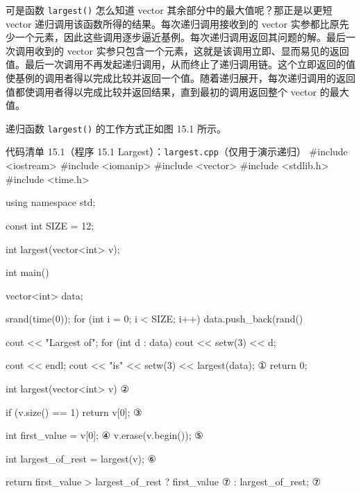 可是函数 \texttt{largest()} 怎么知道 vector 其余部分中的最大值呢？那正是以更短 vector 递归调用该函数所得的结果。每次递归调用接收到的 vector 实参都比原先少一个元素，因此这些调用逐步逼近基例。每次递归调用返回其问题的解。最后一次调用收到的 vector 实参只包含一个元素，这就是该调用立即、显而易见的返回值。最后一次调用不再发起递归调用，从而终止了递归调用链。这个立即返回的值使基例的调用者得以完成比较并返回一个值。随着递归展开，每次递归调用的返回值都使调用者得以完成比较并返回结果，直到最初的调用返回整个 vector 的最大值。


递归函数 \texttt{largest()} 的工作方式正如图 15.1 所示。

\begin{codeboxt}{代码清单 15.1（程序 15.1 Largest）：\texttt{largest.\allowbreak{}cpp}（仅用于演示递归）}
#include <iostream>
#include <iomanip>
#include <vector>
#include <stdlib.h>
#include <time.h>

using namespace std;

const int SIZE = 12;

int largest(vector<int> v);

int main()
{
    vector<int> data;

    srand(time(0));
    for (int i = 0; i < SIZE; i++) data.push_back(rand()%

    cout << "Largest of";
    for (int d : data) cout << setw(3) << d;

    cout << endl;
    cout << "is" << setw(3) << largest(data);               ①
    return 0;
}

int largest(vector<int> v)                                  ②
{
    if (v.size() == 1) return v[0];                         ③

    int first_value = v[0];                                 ④
    v.erase(v.begin());                                     ⑤

    int largest_of_rest = largest(v);                       ⑥

    return first_value > largest_of_rest ? first_value      ⑦
                                         : largest_of_rest; ⑦

}
\end{codeboxt}
\par
{}\par
{}\par
{}\par
{}\par
{}\par
{}\par

